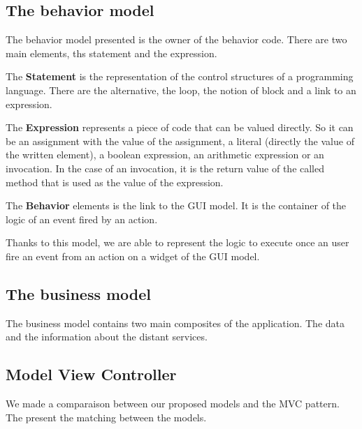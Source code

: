 \documentclass[conference]{IEEEtran}
\begin{document}
\subsection{The behavior model}
\label{sec:behaviorModel}
    

The behavior model presented  is the owner of
    the behavior code.
There are two main elements, ths statement and the expression.

The \textbf{Statement} is the representation of the control structures of
    a programming language.
There are the alternative, the loop, the notion of block and a link to an expression.

The \textbf{Expression} represents a piece of code that can be valued directly.
So it can be an assignment with the value of the assignment,
    a literal (\ie directly the value of the written element),
    a boolean expression, 
    an arithmetic expression
    or an invocation.
In the case of an invocation, it is the return value of the called method that
    is used as the value of the expression.

The \textbf{Behavior} elements is the link to the GUI model.
It is the container of the logic of an event fired by an action.

Thanks to this model, we are able to represent the logic to execute once an user
    fire an event from an action on a widget of the GUI model.



\subsection{The business model}
\label{sec:businessModel}  

The business model contains two main composites of the application.
The data and the information about the distant services.

\subsection{Model View Controller}
\label{sec:mvc}

We made a comparaison between our proposed models and the MVC pattern.
The  present the matching between the models.
\end{document}
